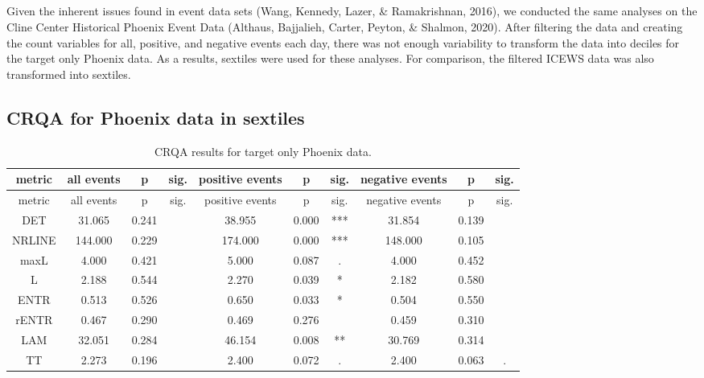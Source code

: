 \clearpage
\makeatletter
\efloat@restorefloats
\makeatother


\begin{appendix}
\section{}
Given the inherent issues found in event data sets (Wang, Kennedy,
Lazer, \& Ramakrishnan, 2016), we conducted the same analyses on the
Cline Center Historical Phoenix Event Data (Althaus, Bajjalieh, Carter,
Peyton, \& Shalmon, 2020). After filtering the data and creating the
count variables for all, positive, and negative events each day, there
was not enough variability to transform the data into deciles for the
target only Phoenix data. As a results, sextiles were used for these
analyses. For comparison, the filtered ICEWS data was also transformed
into sextiles.

\hypertarget{crqa-for-phoenix-data-in-sextiles}{%
\subsection{CRQA for Phoenix data in
sextiles}\label{crqa-for-phoenix-data-in-sextiles}}

\begin{longtable}[]{@{}cccccccccc@{}}
\caption{CRQA results for target only Phoenix data.}\tabularnewline
\toprule
metric & all events & p & sig. & positive events & p & sig. & negative
events & p & sig.\tabularnewline
\midrule
\endfirsthead
\toprule
metric & all events & p & sig. & positive events & p & sig. & negative
events & p & sig.\tabularnewline
\midrule
\endhead
DET & 31.065 & 0.241 & & 38.955 & 0.000 & *** & 31.854 & 0.139
&\tabularnewline
NRLINE & 144.000 & 0.229 & & 174.000 & 0.000 & *** & 148.000 & 0.105
&\tabularnewline
maxL & 4.000 & 0.421 & & 5.000 & 0.087 & . & 4.000 & 0.452
&\tabularnewline
L & 2.188 & 0.544 & & 2.270 & 0.039 & * & 2.182 & 0.580 &\tabularnewline
ENTR & 0.513 & 0.526 & & 0.650 & 0.033 & * & 0.504 & 0.550
&\tabularnewline
rENTR & 0.467 & 0.290 & & 0.469 & 0.276 & & 0.459 & 0.310
&\tabularnewline
LAM & 32.051 & 0.284 & & 46.154 & 0.008 & ** & 30.769 & 0.314
&\tabularnewline
TT & 2.273 & 0.196 & & 2.400 & 0.072 & . & 2.400 & 0.063 &
.\tabularnewline
\bottomrule
\end{longtable}


\end{appendix}
